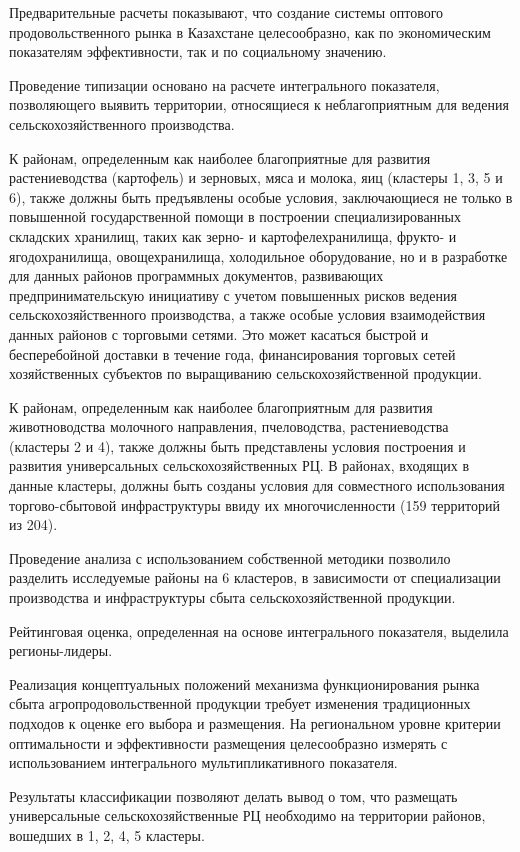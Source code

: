 \begin{multicols}{2}
Предварительные расчеты показывают, что создание системы оптового
продовольственного рынка в Казахстане целесообразно, как по
экономическим показателям эффективности, так и по социальному значению.

Проведение типизации основано на расчете интегрального показателя,
позволяющего выявить территории, относящиеся к неблагоприятным для
ведения сельскохозяйственного производства.

К районам, определенным как наиболее благоприятные для развития
растениеводства (картофель) и зерновых, мяса и молока, яиц (кластеры 1,
3, 5 и 6), также должны быть предъявлены особые условия, заключающиеся
не только в повышенной государственной помощи в построении
специализированных складских хранилищ, таких как зерно- и
картофелехранилища, фрукто- и ягодохранилища, овощехранилища,
холодильное оборудование, но и в разработке для данных районов
программных документов, развивающих предпринимательскую инициативу с
учетом повышенных рисков ведения сельскохозяйственного производства, а
также особые условия взаимодействия данных районов с торговыми сетями.
Это может касаться быстрой и бесперебойной доставки в течение года,
финансирования торговых сетей хозяйственных субъектов по выращиванию
сельскохозяйственной продукции.

К районам, определенным как наиболее благоприятным для развития
животноводства молочного направления, пчеловодства, растениеводства
(кластеры 2 и 4), также должны быть представлены условия построения и
развития универсальных сельскохозяйственных РЦ. В районах, входящих в
данные кластеры, должны быть созданы условия для совместного
использования торгово-сбытовой инфраструктуры ввиду их многочисленности
(159 территорий из 204).

Проведение анализа с использованием собственной методики позволило
разделить исследуемые районы на 6 кластеров, в зависимости от
специализации производства и инфраструктуры сбыта сельскохозяйственной
продукции.

Рейтинговая оценка, определенная на основе интегрального показателя,
выделила регионы-лидеры.

Реализация концептуальных положений механизма функционирования рынка
сбыта агропродовольственной продукции требует изменения традиционных
подходов к оценке его выбора и размещения. На региональном уровне
критерии оптимальности и эффективности размещения целесообразно измерять
с использованием интегрального мультипликативного показателя.

Результаты классификации позволяют делать вывод о том, что размещать
универсальные сельскохозяйственные РЦ необходимо на территории районов,
вошедших в 1, 2, 4, 5 кластеры.


\end{multicols}
